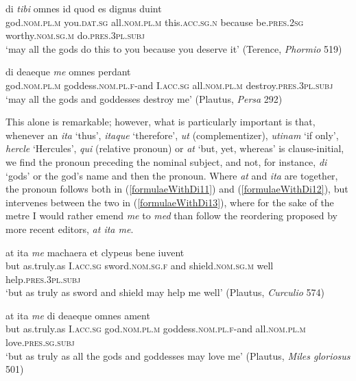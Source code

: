 \begin{exe}
\ex
\gll di \emph{tibi} omnes id quod es dignus duint\\
god.\textsc{nom.pl.m} you.\textsc{dat.sg} all.\textsc{nom.pl.m} this.\textsc{acc.sg.n} because be.\textsc{pres.2sg} worthy.\textsc{nom.sg.m} do.\textsc{pres.3pl.subj}\\
\trans `may all the gods do this to you because you deserve it' (Terence, \textit{Phormio} 519)
\label{formulaeWithDi9}
\end{exe}

\begin{exe}
\ex
\gll di deaeque \emph{me} omnes perdant\\
god.\textsc{nom.pl.m} goddess.\textsc{nom.pl.f}-and I.\textsc{acc.sg} all.\textsc{nom.pl.m} destroy.\textsc{pres.3pl.subj}\\
\trans `may all the gods and goddesses destroy me' (Plautus, \textit{Persa} 292)
\label{formulaeWithDi10}
\end{exe}

This alone is remarkable; however, what is particularly important is that, whenever an \emph{ita} `thus', \emph{itaque} `therefore', \emph{ut} (complementizer), \emph{utinam} `if only', \emph{hercle} `Hercules', \emph{qui} (relative pronoun) or \emph{at} `but, yet, whereas' is clause-initial, we find the pronoun preceding the nominal subject, and not, for instance, \emph{di} `gods' or the god's name and then the pronoun. Where \emph{at} and \emph{ita} are together, the pronoun follows both in (\ref{formulaeWithDi11}) and (\ref{formulaeWithDi12}), but intervenes between the two  in (\ref{formulaeWithDi13}), where for the sake of the metre I would rather emend \emph{me} to \emph{med} than follow the reordering proposed by more recent editors, \emph{at ita me}.

\begin{exe}
\ex
\gll at ita \emph{me} machaera et clypeus bene iuvent\\
but as.truly.as I.\textsc{acc.sg} sword.\textsc{nom.sg.f} and shield.\textsc{nom.sg.m} well help.\textsc{pres.3pl.subj}\\
\trans `but as truly as sword and shield may help me well' (Plautus, \textit{Curculio} 574)
\label{formulaeWithDi11}
\end{exe} 

\begin{exe}
\ex
\gll at ita \emph{me} di deaeque omnes ament\\
but as.truly.as I.\textsc{acc.sg} god.\textsc{nom.pl.m} goddess.\textsc{nom.pl.f}-and all.\textsc{nom.pl.m} love.\textsc{pres.sg.subj}\\
\trans `but as truly as all the gods and goddesses may love me' (Plautus, \textit{Miles gloriosus} 501)
\label{formulaeWithDi12}
\end{exe}

